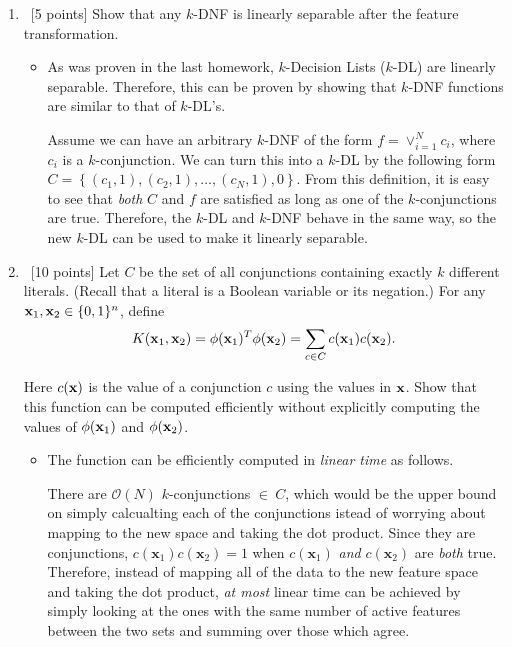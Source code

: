 \begin{enumerate}
\item ~[5 points] Show that any $k$-DNF is linearly separable after
  the feature transformation.

\begin{itemize}
\item As was proven in the last homework, $k$-Decision Lists ($k$-DL) are linearly separable. Therefore, this can be proven by showing that $k$-DNF functions are similar to that of $k$-DL's.

Assume we can have an arbitrary $k$-DNF of the form $f = \vee_{i=1}^{N}c_{i}$, where $c_{i}$ is a $k$-conjunction. We can turn this into a $k$-DL by the following form $C = \left\{(c_{1},1),(c_{2},1),\ldots,(c_{N},1),0  \right\}$. From this definition, it is easy to see that {\em both} $C$ and $f$ are satisfied as long as one of the $k$-conjunctions are true. Therefore, the $k$-DL and $k$-DNF behave in the same way, so the new $k$-DL can be used to make it linearly separable.
\end{itemize} 

\item ~[10 points] Let $C$ be the set of all conjunctions containing
  exactly $k$ different literals. (Recall that a literal is a Boolean
  variable or its negation.) For any ${\bf x}_1, {\bf x}_2 \in \{0, 1\}^n$,
  define
  $$K({\bf x}_1, {\bf x}_2) = \phi({\bf x}_1)^T\phi({\bf x}_2) = \sum_{c \in C} c({\bf x}_1)c({\bf x}_2).$$ 

  Here $c({\bf x})$ is the value of a conjunction $c$ using the values in
  ${\bf x}$. Show that this function can be computed efficiently without
  explicitly computing the values of $\phi({\bf x}_1)$ and $\phi({\bf x}_2)$.

\begin{itemize}
\item The function can be efficiently computed in {\em linear time} as follows.

There are $\mathcal{O}(N)$ $k$-conjunctions $\in\ C$, which would be the upper bound on simply calcualting each of the conjunctions istead of worrying about mapping to the new space and taking the dot product. Since they are conjunctions, $c\left(\mathbf{x}_{1}\right)c\left(\mathbf{x}_{2}\right)=1$ when $c\left(\mathbf{x}_{1}\right)$ {\em and} $c\left(\mathbf{x}_{2}\right)$ are {\em both} true. Therefore, instead of mapping all of the data to the new feature space and taking the dot product, {\em at most} linear time can be achieved by simply looking at the ones with the same number of active features between the two sets and summing over those which agree.
\end{itemize} 


\end{enumerate}
